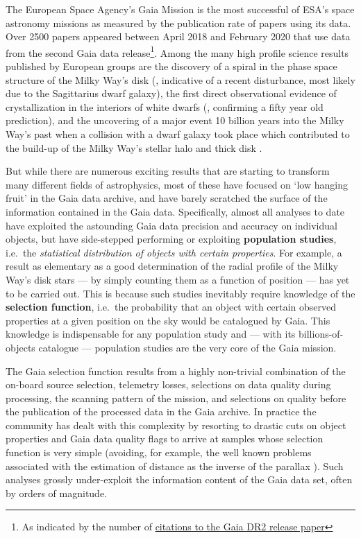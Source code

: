 The European Space Agency's Gaia Mission \cite{2016A&A...595A...1G} is the most successful of ESA's space astronomy missions as measured by the publication rate of papers using its data. Over 2500 papers appeared between April 2018 and February 2020 that use data from the second Gaia data release\footnote{As indicated by the number of  \href{https://ui.adsabs.harvard.edu/search/q=citations(bibcode\%3A2018A\%26A...616A...1G)&sort=date\%20desc\%2C\%20bibcode\%20desc&p_=0}{citations to the Gaia DR2 release paper}}. Among the many high profile science results published by European groups are the discovery of a spiral in the phase space structure of the Milky Way's disk (\cite{Antoja2018a}, indicative of a recent disturbance, most likely due to the Sagittarius dwarf galaxy), the first direct observational evidence of crystallization in the interiors of white dwarfs (\cite{2019Natur.565..202T}, confirming a fifty year old prediction), and the uncovering of a major event 10 billion years into the Milky Way's past when a collision with a dwarf galaxy took place which contributed to the build-up of the Milky Way's stellar halo and thick disk \cite{2018Natur.563...85H, 2018MNRAS.478..611B, 2019arXiv190904679B}. 

But while there are numerous exciting results that are starting to transform many different fields of astrophysics, most of these have focused on `low hanging fruit' in the Gaia data archive, and have barely scratched the surface of the information contained in the Gaia data. Specifically, almost all analyses to date have exploited the astounding Gaia data precision and accuracy on individual objects, but have side-stepped performing or exploiting \textbf{population studies}, i.e.\ the \textsl{statistical distribution of objects with certain properties}. For example, a result as elementary as a good determination of the radial profile of the Milky Way's disk stars --- by simply counting them as a function of position --- has yet to be carried out. This is because such studies inevitably require knowledge of the \textbf{selection function}, i.e.\ the probability that an object with certain observed properties at a given position on the sky would be catalogued by Gaia. This knowledge is indispensable for any population study and --- with its billions-of-objects catalogue --- population studies are the very core of the Gaia mission.

The Gaia selection function results from a highly non-trivial combination of the on-board source selection, telemetry losses, selections on data quality during processing, the scanning pattern of the mission, and selections on quality before the publication of the processed data in the Gaia archive. In practice the community has dealt with this complexity by resorting to drastic cuts on object properties and Gaia data quality flags to arrive at samples whose selection function is very simple (avoiding, for example, the well known problems associated with the estimation of distance as the inverse of the parallax \cite{2018A&A...616A...9L}). Such analyses grossly under-exploit the information content of the Gaia data set, often by orders of magnitude.

